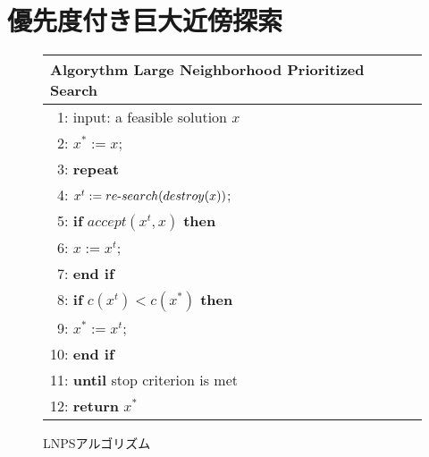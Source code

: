 \section{優先度付き巨大近傍探索}
\begin{figure}[tb]\centering
\begin{tabular}{l}\hline
\textbf{Algorythm} Large Neighborhood Prioritized Search\\\hline
 ~1: input: a feasible solution $x$ \\
 ~2: $x^{*} :=  x$; \\
 ~3: \bf{repeat} \\
 ~4: \quad \quad $x^{t} := re\mathchar`-search(destroy(x))$; \\
 ~5: \quad \quad \textbf{if} $accept(x^{t}, x)$ \textbf{then} \\
 ~6: \quad \quad \quad \quad $x := x^{t}$; \\
 ~7: \quad \quad \textbf{end if} \\
 ~8: \quad \quad \textbf{if} $c(x^{t}) < c(x^{*})$ \textbf{then} \\
 ~9: \quad \quad \quad \quad $x^{*} := x^{t}$; \\
10: \quad \quad \textbf{end if} \\
11: \textbf{until} stop criterion is met \\
12: \textbf{return} $x^{*}$ \\ \hline
\end{tabular}
\caption{LNPSアルゴリズム}
\label{algo:lnps}
\end{figure}
%

